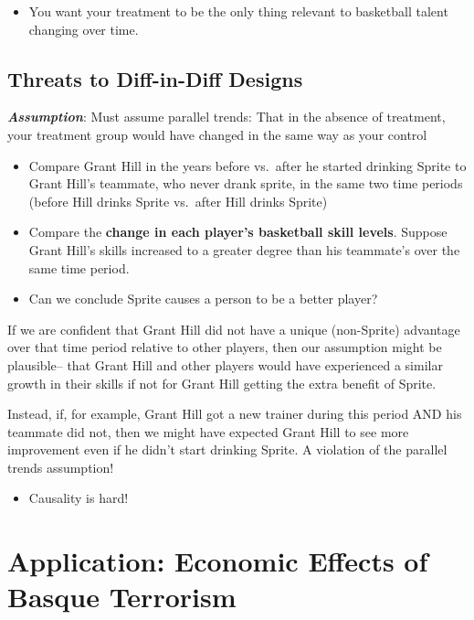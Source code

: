 \documentclass[
  letterpaper,
  DIV=11,
  numbers=noendperiod]{scrreprt}
\providecommand{\tightlist}{%
  \setlength{\itemsep}{0pt}\setlength{\parskip}{0pt}}\usepackage{longtable,booktabs,array}
\begin{document}
\begin{itemize}
\tightlist
\item
  You want your treatment to be the only thing relevant to basketball
  talent changing over time.
\end{itemize}

\hypertarget{threats-to-diff-in-diff-designs}{%
\subsection{Threats to Diff-in-Diff
Designs}\label{threats-to-diff-in-diff-designs}}

\textbf{\emph{Assumption}}: Must assume parallel trends: That in the
absence of treatment, your treatment group would have changed in the
same way as your control

\begin{itemize}
\tightlist
\item
  Compare Grant Hill in the years before vs.~after he started drinking
  Sprite to Grant Hill's teammate, who never drank sprite, in the same
  two time periods (before Hill drinks Sprite vs.~after Hill drinks
  Sprite)
\item
  Compare the \textbf{change in each player's basketball skill levels}.
  Suppose Grant Hill's skills increased to a greater degree than his
  teammate's over the same time period.
\item
  Can we conclude Sprite causes a person to be a better player?
\end{itemize}

If we are confident that Grant Hill did not have a unique (non-Sprite)
advantage over that time period relative to other players, then our
assumption might be plausible-- that Grant Hill and other players would
have experienced a similar growth in their skills if not for Grant Hill
getting the extra benefit of Sprite.

Instead, if, for example, Grant Hill got a new trainer during this
period AND his teammate did not, then we might have expected Grant Hill
to see more improvement even if he didn't start drinking Sprite. A
violation of the parallel trends assumption!

\begin{itemize}
\tightlist
\item
  Causality is hard!
\end{itemize}

\hypertarget{application-economic-effects-of-basque-terrorism}{%
\section{Application: Economic Effects of Basque
Terrorism}\label{application-economic-effects-of-basque-terrorism}}
\end{document}

